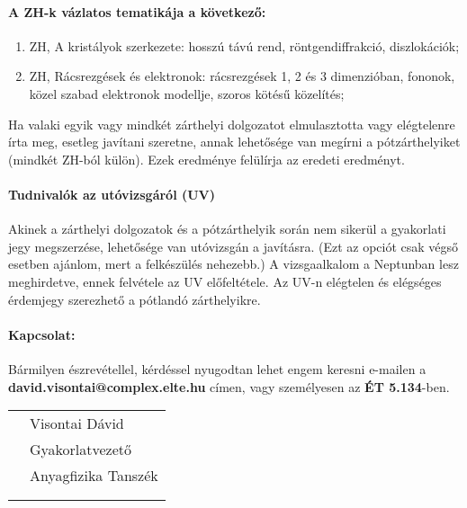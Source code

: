 \documentclass[12pt]{article}
\begin{document}
\paragraph{A ZH-k vázlatos tematikája a következő:}
\begin{enumerate}
\item  ZH, A kristályok szerkezete: hosszú távú rend, röntgendiffrakció, diszlokációk;
\item  ZH, Rácsrezgések és elektronok: rácsrezgések 1, 2 és 3 dimenzióban, fononok, közel szabad elektronok modellje, szoros kötésű közelítés;
\end{enumerate}
Ha valaki egyik vagy mindkét zárthelyi dolgozatot elmulasztotta vagy elégtelenre írta meg, esetleg javítani szeretne, annak lehetősége van megírni a pótzárthelyiket (mindkét ZH-ból külön). Ezek eredménye felülírja az eredeti eredményt.

\paragraph{Tudnivalók az utóvizsgáról (UV) }
Akinek a zárthelyi dolgozatok és a pótzárthelyik során nem sikerül a gyakorlati jegy megszerzése, lehetősége van utóvizsgán a javításra. (Ezt az opciót csak végső esetben ajánlom, mert a felkészülés nehezebb.) A vizsgaalkalom a Neptunban lesz meghirdetve, ennek felvétele az UV előfeltétele. Az UV-n elégtelen és elégséges érdemjegy szerezhető a pótlandó zárthelyikre.

\paragraph{Kapcsolat:}
Bármilyen észrevétellel, kérdéssel nyugodtan lehet engem keresni
e-mailen a \textbf{david.visontai@complex.elte.hu} címen, vagy személyesen az \textbf{ÉT 5.134}-ben.
\\
 
\vfill
\begin{tabular}{@{}p{2.5in}p{2in}@{}}
& Visontai Dávid \\
& Gyakorlatvezető\\
& Anyagfizika Tanszék\\
& \\
& \\
\end{tabular}
\end{document}
